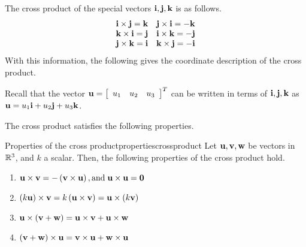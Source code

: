 The cross product of the special vectors ${\bf i}, {\bf j},
{\bf k}$ is as follows.  
\begin{equation*}
\begin{array}{cc}
{\bf i}\times {\bf j}={\bf k} & {\bf j}\times {\bf i}=-{\bf k} \\
{\bf k}\times {\bf i}={\bf j} & {\bf i}\times {\bf k}=-{\bf j} \\
{\bf j}\times {\bf k}={\bf i} & {\bf k}\times {\bf j}=-{\bf i}
\end{array}
\end{equation*}
With this information, the following gives the coordinate description of the
cross product.

Recall that the vector ${\bf u}= \left[ 
\begin{array}{ccc}
u_1 & u_2 & u_3
\end{array}
\right]^T$
can be written in terms of ${\bf i}, {\bf j}, {\bf k}$ as ${\bf u}=u_{1}{\bf i}+u_{2}{\bf j}+u_{3}{\bf k}$. 

The cross product satisfies the following properties.

\begin{proposition}{Properties of the cross product}{propertiescrossproduct}
Let ${\bf u}, {\bf v}, {\bf w}$ be vectors in $\mathbb{R}^3$, and $k$ a scalar. Then, the following properties 
of the cross product hold.
\begin{enumerate}
\item 
${\bf u}\times {\bf v}= -\left( {\bf v}\times {\bf u}\right), 
\mbox{and} \; {\bf u}\times {\bf u}={\bf 0}$
\item 
$\left( k {\bf u}\right)\times {\bf v}= k \left( {\bf u}\times {\bf v}\right) 
={\bf u}\times \left( k {\bf v}\right)$
\item
${\bf u}\times \left( {\bf v}+{\bf w}\right) ={\bf u}\times {\bf v}+{\bf u}\times {\bf w}$
\item 
$\left( {\bf v}+{\bf w}\right) \times {\bf u}={\bf v} \times {\bf u}+{\bf w}\times {\bf u}$
\end{enumerate}
\end{proposition}

